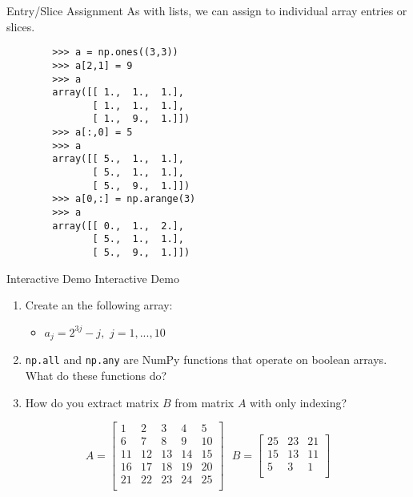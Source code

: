 \documentclass[serif,xcolor=pdftex,dvipsnames,table,hyperref={bookmarks=false,breaklinks}]{beamer}
\begin{document}
\begin{frame}[t,fragile]{Entry/Slice Assignment}
	As with lists, we can assign to individual array entries or slices.

	\begin{lstlisting}
		>>> a = np.ones((3,3))
		>>> a[2,1] = 9
		>>> a
		array([[ 1.,  1.,  1.],
		       [ 1.,  1.,  1.],
		       [ 1.,  9.,  1.]]) 
		>>> a[:,0] = 5
		>>> a
		array([[ 5.,  1.,  1.],
		       [ 5.,  1.,  1.],
		       [ 5.,  9.,  1.]])
		>>> a[0,:] = np.arange(3)
		>>> a
		array([[ 0.,  1.,  2.],
		       [ 5.,  1.,  1.],
		       [ 5.,  9.,  1.]])
	\end{lstlisting}
\end{frame}

\begin{frame}[t,fragile]{Interactive Demo}
	\centering
	\Huge{Interactive Demo}
	\normalsize
	\begin{enumerate}
		\item Create an the following array:
		\begin{itemize}
			\item $a_j = 2^{3j} - j,\,\,j = 1,...,10$
		\end{itemize}
		\item \verb|np.all| and \verb|np.any| are NumPy functions that operate on boolean arrays. What do these functions do?
		\item How do you extract matrix $B$ from matrix $A$ with only indexing?
	\end{enumerate}
	
	$$ A = 
		\begin{bmatrix}
			1 & 2 & 3 & 4 & 5\\
			6 & 7 & 8 & 9 & 10\\
			11 & 12 & 13 & 14 & 15\\
			16 & 17 & 18 & 19 & 20\\
			21 & 22 & 23 & 24 & 25\\
		\end{bmatrix}\,\,\,\, B = 
		\begin{bmatrix}
			25 & 23 & 21\\
			15 & 13 & 11\\
			5 & 3 & 1\\
		\end{bmatrix}$$
\end{frame}
\end{document}
